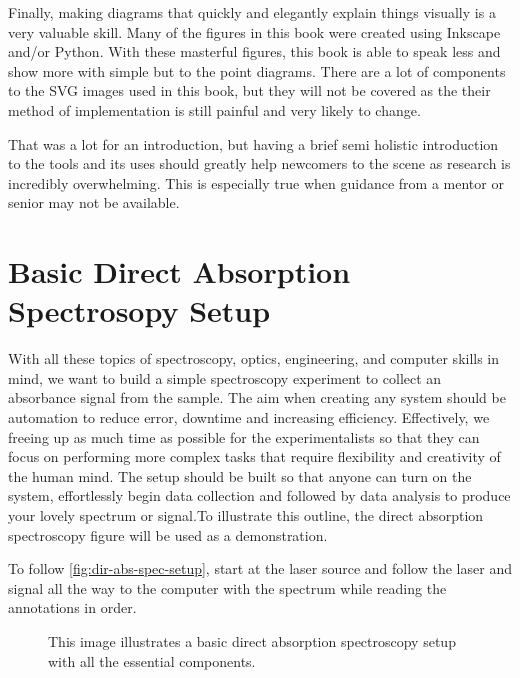 \documentclass[11pt,a4paper]{book}
\newcommand{\imginput}[1]{} %
\begin{document}
		Finally, making diagrams that quickly and elegantly explain things visually is a very valuable skill. Many of the figures in this book were created using Inkscape and/or Python. With these masterful figures, this book is able to speak less and show more with simple but to the point diagrams. There are a lot of components to the SVG images used in this book, but they will not be covered as the their method of implementation is still painful and very likely to change.
		
		That was a lot for an introduction, but having a brief semi holistic introduction to the tools and its uses should greatly help newcomers to the scene as research is incredibly overwhelming. This is especially true when guidance from a mentor or senior may not be available.
	\section{Basic Direct Absorption Spectrosopy Setup}
		\label{sec:Basic Direct Absorption Spectrosopy Setup}
		With all these topics of spectroscopy, optics, engineering, and computer skills in mind, we want to build a simple spectroscopy experiment to collect an absorbance signal from the sample. The aim when creating any system should be automation to reduce error, downtime and increasing efficiency. Effectively, we freeing up as much time as possible for the experimentalists so that they  can focus on performing more complex tasks that require flexibility and creativity of the human mind. The setup should be built so that anyone can turn on the system, effortlessly begin data collection and followed by data analysis to produce your lovely spectrum or signal.To illustrate this outline, the direct absorption spectroscopy figure will be used as a demonstration. 
		
		To follow \autoref{fig:dir-abs-spec-setup}, start at the laser source and follow the laser and signal all the way to the computer with the spectrum while reading the annotations in order.	
		
		\begin{figure} [!ht]
			\centering
			\def\svgwidth{\columnwidth}
			\resizebox{16cm}{!}{\imginput{images/dir-abs-spec-setup.pdf_tex}}
			\caption{This image illustrates a basic direct absorption spectroscopy setup with all the essential components.}
			\label{fig:dir-abs-spec-setup}
		\end{figure}	
		
\end{document}
